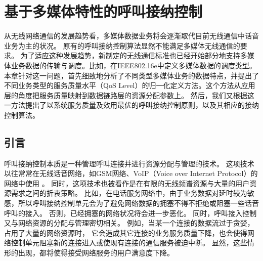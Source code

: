 \graphicspath{ {../body/cacop_figures/}}
\chapter{基于多媒体特性的呼叫接纳控制}
\label{chap_cacop}

从无线网络通信的发展趋势看，多媒体数据业务将会逐渐取代目前无线通信中话音业务为主的状况。
原有的呼叫接纳控制算法显然不能满足多媒体无线通信的要求。
为了适应这种发展趋势，新制定的无线通信标准也已经开始部分地支持多媒体业务数据的传输与调度。比如，在IEEE802.16e中定义多媒体数据的调度类型。
本章针对这一问题，首先细致地分析了不同类型多媒体业务的数据特点，并提出了不同业务类型的服务质量水平（QoS Level）的归一化定义方法。这个方法从应用层的角度把服务质量映射到数据链路层的资源分配参数上。
然后，我们又根据这一方法提出了以系统服务质量及效用最优的呼叫接纳控制原则，以及其相应的接纳控制算法。

\section{引言}
呼叫接纳控制本质是一种管理呼叫连接并进行资源分配与管理的技术。
这项技术以往常常在无线话音网络，如GSM网络、VoIP（Voice over Internet Protocol）的网络中使用\cite{Perros1996}\cite{Mase2004}
\cite{Systems_2001}\cite{Y-G-Fang.TVT.2002}\cite{Y-Xiao.IEICE.TC.2001}。
同时，这项技术也被看作是在有限的无线频谱资源与大量的用户资源需求之间的折衷策略。
比如，在电话服务网络中，由于业务数据对延时较为敏感，所以呼叫接纳控制单元会为了避免网络数据的拥塞不得不拒绝或阻塞一些话音呼叫的接入。
否则，已经拥塞的网络状况将会进一步恶化。
同时，呼叫接入控制又与网络资源的分配与管理密切相关。
例如，当某一个连接的数据流过于贪婪，占用了大量的网络资源时，
它会造成其它连接的业务服务质量下降，也会使得网络控制单元阻塞新的连接进入或使现有连接的通信服务被迫中断。
显然，这些情形的出现，都将使得接受网络服务的用户满意度下降。

